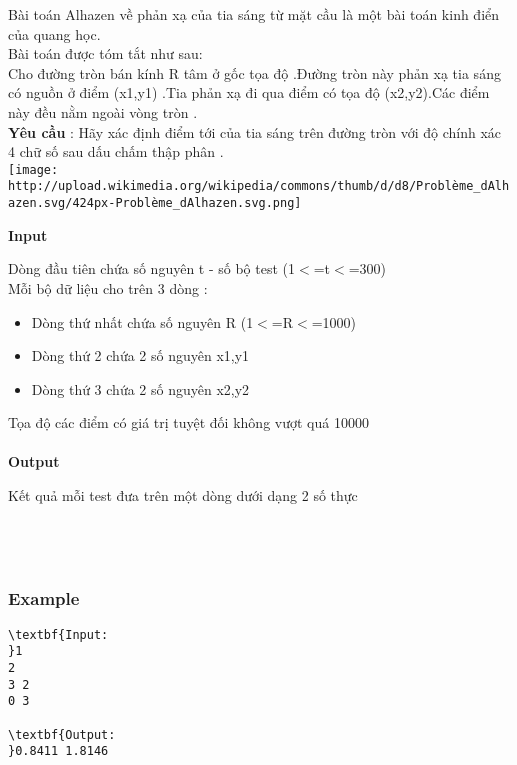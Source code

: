 

Bài toán Alhazen về phản xạ của tia sáng từ mặt cầu là một bài toán kinh điển của quang học.
\\Bài toán được tóm tắt như sau:
\\Cho đường tròn bán kính R tâm ở gốc tọa độ .Đường tròn này phản xạ tia sáng có nguồn ở điểm (x1,y1) .Tia phản xạ đi qua điểm có tọa độ (x2,y2).Các điểm này đều nằm ngoài vòng tròn .
\\\textbf{Yêu cầu } : Hãy xác định điểm tới của tia sáng trên đường tròn với độ chính xác 4 chữ số sau dấu chấm thập phân .
\\
\texttt{[image: http://upload.wikimedia.org/wikipedia/commons/thumb/d/d8/Problème\_dAlhazen.svg/424px-Problème\_dAlhazen.svg.png]}\textbf{}

\textbf{Input }

Dòng đầu tiên chứa số nguyên t - số bộ test (1$<$=t$<$=300)
\\Mỗi bộ dữ liệu cho trên 3 dòng :
\begin{itemize}
	\item Dòng thứ nhất chứa số nguyên R (1$<$=R$<$=1000)
	\item Dòng thứ 2 chứa 2 số nguyên x1,y1
	\item Dòng thứ 3 chứa 2 số nguyên x2,y2
\end{itemize}

Tọa độ các điểm có giá trị tuyệt đối không vượt quá 10000
\\
\\\textbf{\textbf{Output }}

Kết quả mỗi test đưa trên một dòng dưới dạng 2 số thực
\\
\\
\\ 

\subsubsection{Example}
\begin{verbatim}
\textbf{Input:
}1
2
3 2
0 3

\textbf{Output:
}0.8411 1.8146


\end{verbatim}